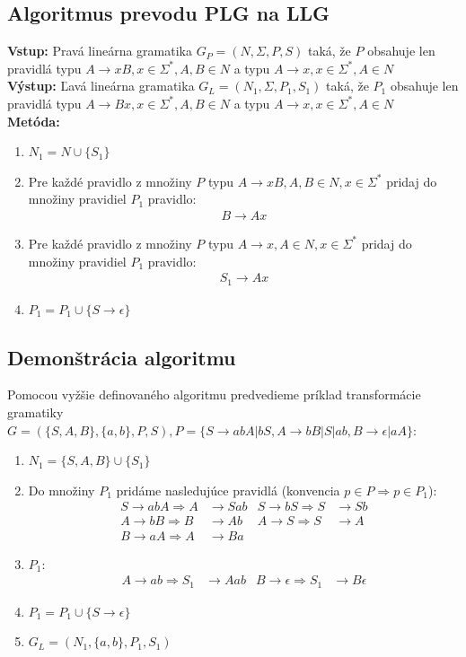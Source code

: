 \documentclass[10pt]{article}
\begin{document}
\subsection*{Algoritmus prevodu PLG na LLG}
\textbf{Vstup:} Pravá lineárna gramatika $G_P = (N, \Sigma, P, S)$ taká, že $P$ obsahuje len pravidlá typu
$A\to xB, x \in \Sigma^*, A,B \in N$ a typu $A\to x, x \in \Sigma^*, A \in N$\\
\textbf{Výstup:} Ľavá lineárna gramatika $G_L = (N_1, \Sigma, P_1, S_1)$ taká, že $P_1$ obsahuje len pravidlá typu
$A\to Bx, x \in \Sigma^*, A,B \in N$ a typu $A\to x, x \in \Sigma^*, A \in N$\\
\textbf{Metóda:}
\begin{enumerate}
    \item $N_1 = N \cup \{S_1\}$
    \item Pre každé pravidlo z množiny $P$ typu $A\to xB, A,B \in N, x \in \Sigma^*$ pridaj
        do množiny pravidiel $P_1$ pravidlo:\\
        \begin{align*}
            B\to Ax
        \end{align*}
    \item Pre každé pravidlo z množiny $P$ typu $A\to x, A \in N, x \in \Sigma^*$ pridaj do
        množiny pravidiel $P_1$ pravidlo:\\
        \begin{align*}
            S_1\to Ax
        \end{align*}
    \item $P_1 = P_1 \cup \{S\to\epsilon\}$
\end{enumerate}

\subsection*{Demonštrácia algoritmu}
Pomocou vyžšie definovaného algoritmu predvedieme príklad transformácie gramatiky $G = (\{S,A,B\}, \{a, b\}, P, S),
P = \{S\to abA|bS, A\to bB|S|ab, B\to \epsilon | aA \}$:
\begin{enumerate}
    \item $N_1 = \{S, A, B\} \cup \{ S_1\}$
    \item Do množiny $P_1$ pridáme nasledujúce pravidlá (konvencia $p \in P  \Longrightarrow
        p \in P_1$): 
            \begin{align*}
       S\to abA \Longrightarrow  A&\to Sab  &  S\to bS \Longrightarrow  S&\to Sb\\
        A\to bB \Longrightarrow   B&\to Ab   & A\to S \Longrightarrow   S&\to A \\ 
         B\to aA \Longrightarrow  A&\to Ba
            \end{align*}
    \item $P_1$: 
            \begin{align*}
          A\to ab \Longrightarrow       S_1&\to Aab & B\to \epsilon \Longrightarrow   S_1&\to B\epsilon
            \end{align*}
    \item $P_1 = P_1 \cup \{S \to \epsilon\}$
    \item $G_L = (N_1, \{a,b\}, P_1, S_1)$

\end{enumerate}
\end{document}
